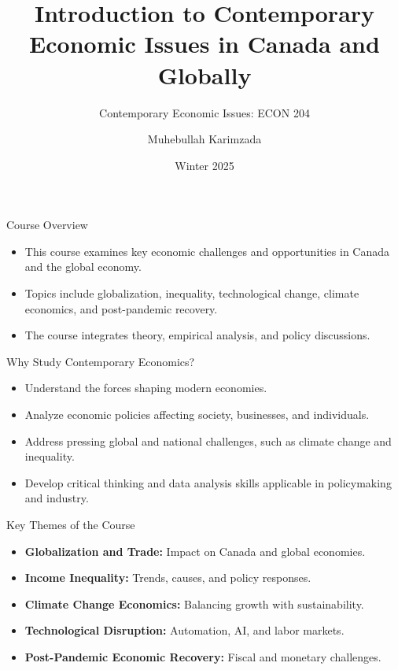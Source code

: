 \documentclass{beamer}
\title{Introduction to Contemporary Economic Issues in Canada and Globally}
\subtitle{Contemporary Economic Issues: ECON 204}
\author{Muhebullah Karimzada}
\date{Winter 2025}
\begin{document}
\begin{frame}
  \titlepage
\end{frame}

\begin{frame}{Course Overview}
  \begin{itemize}
    \item This course examines key economic challenges and opportunities in Canada and the global economy.
    \item Topics include globalization, inequality, technological change, climate economics, and post-pandemic recovery.
    \item The course integrates theory, empirical analysis, and policy discussions.
  \end{itemize}
\end{frame}

\begin{frame}{Why Study Contemporary Economics?}
  \begin{itemize}
    \item Understand the forces shaping modern economies.
    \item Analyze economic policies affecting society, businesses, and individuals.
    \item Address pressing global and national challenges, such as climate change and inequality.
    \item Develop critical thinking and data analysis skills applicable in policymaking and industry.
  \end{itemize}
\end{frame}

\begin{frame}{Key Themes of the Course}
  \begin{itemize}
    \item \textbf{Globalization and Trade:} Impact on Canada and global economies.
    \item \textbf{Income Inequality:} Trends, causes, and policy responses.
    \item \textbf{Climate Change Economics:} Balancing growth with sustainability.
    \item \textbf{Technological Disruption:} Automation, AI, and labor markets.
    \item \textbf{Post-Pandemic Economic Recovery:} Fiscal and monetary challenges.
  \end{itemize}
\end{frame}
\end{document}
